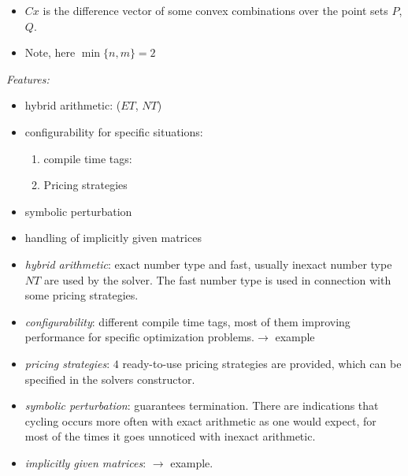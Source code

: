 \documentclass{slides}
\begin{document}
\begin{note}
\begin{itemize}
\item $Cx$ is the difference vector of some convex combinations over the point
sets $P$, $Q$.
\item Note, here $\min\{n,m\}=2$
\end{itemize}
\end{note}

\begin{slide}
\emph{Features:}
\begin{itemize}
\item hybrid arithmetic: ($ET$, $NT$)
\item configurability for specific situations:
  \begin{enumerate}
  \item compile time tags: 
  \item Pricing strategies
  \end{enumerate}
\item symbolic perturbation
\item handling of implicitly given matrices
\end{itemize}
\end{slide}

\begin{note}
\begin{itemize}
\item \emph{hybrid arithmetic}: exact number type and fast, usually inexact
number type $NT$ are used by the solver. The fast number type is used in
connection with some pricing strategies.
\item \emph{configurability}: different compile time tags, most of them
improving performance for specific optimization problems.$\rightarrow$ example
\item \emph{pricing strategies}: $4$ ready-to-use pricing strategies are
provided, which can be specified in the solvers constructor.
\item \emph{symbolic perturbation}: guarantees termination.  
There are indications that cycling occurs more often with exact arithmetic as
one would expect, for most of the times it goes unnoticed with inexact
arithmetic.
\item \emph{implicitly given matrices}: $\rightarrow$ example. 
\end{itemize}
\end{note}
\end{document}
